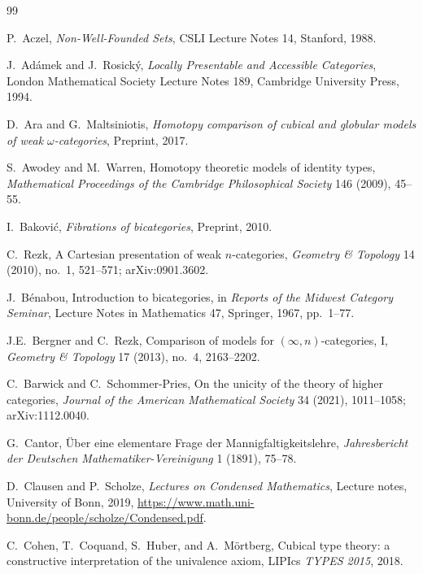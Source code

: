 \documentclass[11pt]{article}
\theoremstyle{plain}
\theoremstyle{definition}
\begin{document}
\begin{thebibliography}{99}

P.~Aczel,
\newblock \emph{Non-Well-Founded Sets},
\newblock CSLI Lecture Notes 14, Stanford, 1988.

J.~Ad\'amek and J.~Rosick\'y,
\newblock \emph{Locally Presentable and Accessible Categories},
\newblock London Mathematical Society Lecture Notes 189, Cambridge University Press, 1994.

D.~Ara and G.~Maltsiniotis,
\newblock \emph{Homotopy comparison of cubical and globular models of weak $\omega$-categories},
\newblock Preprint, 2017.

S.~Awodey and M.~Warren,
\newblock Homotopy theoretic models of identity types,
\newblock \emph{Mathematical Proceedings of the Cambridge Philosophical Society} 146 (2009), 45--55.

I.~Bakovi\'c,
\newblock \emph{Fibrations of bicategories},
\newblock Preprint, 2010.

C.~Rezk,
\newblock A Cartesian presentation of weak $n$-categories,
\newblock \emph{Geometry \& Topology} 14 (2010), no.~1, 521--571; arXiv:0901.3602.

J.~B\'enabou,
\newblock Introduction to bicategories,
\newblock in \emph{Reports of the Midwest Category Seminar}, Lecture Notes in Mathematics 47, Springer, 1967, pp.~1--77.

J.E.~Bergner and C.~Rezk,
\newblock Comparison of models for $(\infty, n)$-categories, I,
\newblock \emph{Geometry \& Topology} 17 (2013), no.~4, 2163--2202.

C.~Barwick and C.~Schommer-Pries,
\newblock On the unicity of the theory of higher categories,
\newblock \emph{Journal of the American Mathematical Society} 34 (2021), 1011--1058; arXiv:1112.0040.

G.~Cantor,
\newblock \"Uber eine elementare Frage der Mannigfaltigkeitslehre,
\newblock \emph{Jahresbericht der Deutschen Mathematiker-Vereinigung} 1 (1891), 75--78.

D.~Clausen and P.~Scholze,
\newblock \emph{Lectures on Condensed Mathematics},
\newblock Lecture notes, University of Bonn, 2019,
\newblock \url{https://www.math.uni-bonn.de/people/scholze/Condensed.pdf}.

C.~Cohen, T.~Coquand, S.~Huber, and A.~M\"ortberg,
\newblock Cubical type theory: a constructive interpretation of the univalence axiom,
\newblock LIPIcs \emph{TYPES 2015}, 2018.


\end{thebibliography}
\end{document}
